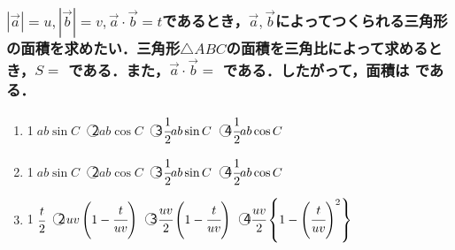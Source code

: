 \documentclass[onecolumn,10pt]{jarticle}
\newcommand{\ctext}[1]{\textcircled{\scriptsize #1}}
\begin{document}
\subsubsection{$|\vec{a}|=u,|\vec{b}|=v,\vec{a}\cdot\vec{b}=t$であるとき，$\vec{a},\vec{b}$によってつくられる三角形の面積を求めたい．三角形$\triangle{ABC}$の面積を三角比によって求めるとき，$S=$  である．また，$\vec{a}\cdot\vec{b}=$  である．したがって，面積は  である．}
\begin{enumerate}[(1)]
    \item \ctext{1}$ab\sin{C}$　\ctext{2}$ab\cos{C}$　\ctext{3}$\cfrac{1}{2}ab\sin{C}$　\ctext{4}$\cfrac{1}{2}ab\cos{C}$
    \item \ctext{1}$ab\sin{C}$　\ctext{2}$ab\cos{C}$　\ctext{3}$\cfrac{1}{2}ab\sin{C}$　\ctext{4}$\cfrac{1}{2}ab\cos{C}$
    \item \ctext{1}$\cfrac{t}{2}$　\ctext{2}$uv\left(1-\cfrac{t}{uv}\right)$　\ctext{3}$\cfrac{uv}{2}\left(1-\cfrac{t}{uv}\right)$　\ctext{4}$\cfrac{uv}{2}\left\{1-\left(\cfrac{t}{uv}\right)^2\right\}$
\end{enumerate}
\end{document}
